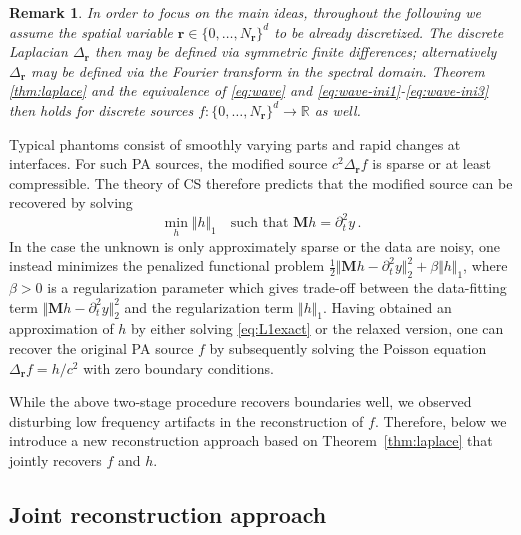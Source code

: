 \documentclass[11pt]{article}
\newcommand{\rr}{\mathbf r}
\newcommand{\data}{y}
\newcommand{\source}{f}
\newcommand{\Lsource}{h}
\newcommand{\R}{\mathbb R}
\newcommand\norm[1]{\Vert#1\Vert}
\newcommand{\set}[1]{\{#1\}}
\newcommand{\fullop}{\mathbf M}
\newtheorem{remark}{Remark}[section]
\begin{document}


\begin{remark} \label{rem:discrete}
	In order to focus on the main ideas, throughout
	the following we assume the spatial variable
	$\rr  \in \set{0, \dots, N_\rr}^d$ to be already discretized.
	The discrete Laplacian $\Delta_\rr$ then may be defined  via
	symmetric  finite differences; alternatively $\Delta_\rr$ may be defined
	via the Fourier transform in the spectral domain.
	Theorem \ref{thm:laplace} and the equivalence of \eqref{eq:wave} and
	\eqref{eq:wave-ini1}-\eqref{eq:wave-ini3}  then holds for discrete
	sources   $f \colon \set{0, \dots, N_\rr}^d \to \R$ as well.
\end{remark}

Typical  phantoms  consist of smoothly varying parts
and rapid changes  at interfaces. For such PA sources,
the modified source  $c^2 \Delta_{\rr} \source$
is sparse or at least compressible. The theory of
CS therefore predicts that the modified source
can be recovered by solving
\begin{equation} \label{eq:L1exact}
\min_{ \Lsource}     \norm{\Lsource}_1
\quad \text{such that }     \fullop \Lsource  =   \partial_t^2 \data       \,.
\end{equation}
In the case the unknown  is only  approximately sparse or the  data
are  noisy, one instead minimizes the penalized functional
problem $\frac{1}{2}  \norm{\fullop \Lsource  -   \partial_t^2 \data}_2^2
+\beta \norm{\Lsource}_1$, where $\beta >0$ is a regularization parameter
which gives trade-off between the data-fitting term $\norm{\fullop \Lsource  -   \partial_t^2 \data}_2^2$ and the regularization term  $\norm{\Lsource}_1$. Having obtained an approximation of $\Lsource$
by either solving \eqref{eq:L1exact} or  the relaxed version,  one can recover
the original PA source $\source $ by subsequently solving the Poisson
equation $   \Delta_{\rr} \source  = \Lsource/c^2$ with zero
boundary conditions.

While the  above two-stage procedure recovers boundaries well,
we  observed disturbing low frequency artifacts
in the reconstruction of $f$. Therefore, below we
introduce   a new  reconstruction approach based on Theorem~\ref{thm:laplace}
that jointly recovers $\source$ and $\Lsource$.

\subsection{Joint reconstruction approach}
\end{document}
